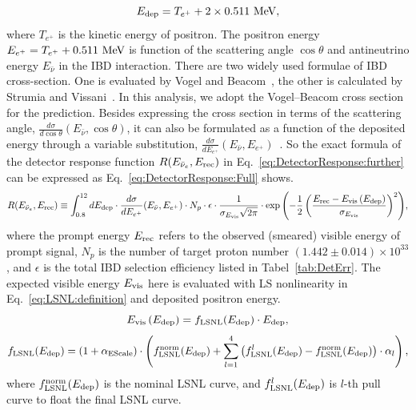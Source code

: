 \begin{equation}
    E_{\rm dep}=T_{e^+}+2\times0.511\ {\rm{MeV}},
    \label{eq:E_dep}
\end{equation}
where $T_{e^+}$ is the kinetic energy of positron. The positron energy $E_{e^+}=T_{e^+}+0.511~\rm{MeV}$ is function of the scattering angle $\cos\theta$ and antineutrino energy $E_{\bar{\nu}}$ in the IBD interaction. There are two widely used formulae of IBD cross-section. One is evaluated by Vogel and Beacom~\cite{Vogel:1999zy}, the other is calculated by Strumia and Vissani~\cite{Strumia:2003zx}. In this analysis, we adopt the Vogel–Beacom cross section for the prediction. Besides expressing the cross section in terms of the scattering angle, $\frac{d\sigma}{d\cos\theta}(E_{\bar{\nu}},\cos\theta)$, it can also be formulated as a function of the deposited energy through a variable substitution, $\frac{d\sigma}{dE_{e^+}}(E_{\bar{\nu}},E_{e^+})$~\cite{Vogel:1999zy}.
So the exact formula of the detector response function $R(E_{\bar{\nu}_e}, E_{\rm{rec}})$ in Eq.~\eqref{eq:DetectorResponse:further} can be expressed as Eq.~\eqref{eq:DetectorResponse:Full} shows.
\begin{equation}
    R(E_{\bar{\nu}_e}, E_{\rm{rec}}) \equiv \int_{0.8}^{12} dE_{\rm dep} \cdot \frac{d\sigma}{dE_{e^+}}(E_{\bar{\nu}},E_{e^+})
    \cdot N_p \cdot \epsilon \cdot
    \frac{1}{\sigma_{E_{\rm vis}}\sqrt{2\pi}}\cdot
    \exp{\left(-\frac{1}{2}\left(\frac{E_{\rm{rec}}-E_{\rm vis}\left(E_{\rm dep}\right)}{\sigma_{E_{\rm vis}}}\right)^2\right)},
    \label{eq:DetectorResponse:Full}
\end{equation}
where the prompt energy $E_{\rm{rec}}$ refers to the observed (smeared) visible energy of prompt signal, $N_p$ is the number of target proton number $(1.442\pm0.014)\times10^{33}$, and $\epsilon$ is the total IBD selection efficiency listed in Tabel~\ref{tab:DetErr}. The expected visible energy $E_{\rm vis}$ here is evaluated with LS nonlinearity in Eq.~\eqref{eq:LSNL:definition} and deposited positron energy.
\begin{equation}
    E_{\rm vis}\left(E_{\rm dep}\right)=f_{\rm LSNL}(E_{\rm dep})\cdot E_{\rm dep},
    \label{eq:LSNL:definition}
\end{equation}
\begin{equation}
    f_{\rm LSNL}(E_{\rm dep}) = \left( 1+\alpha_{\rm EScale} \right) \cdot \left( f_{\rm LSNL}^{\rm norm}(E_{\rm dep})+\sum_{l=1}^{4}\left(f_{\rm LSNL}^{l}(E_{\rm dep})-f_{\rm LSNL}^{\rm norm}(E_{\rm dep})\right) \cdot \alpha_{l} \right),
    \label{eq:LSNL:correction}
\end{equation}
where $f_{\rm LSNL}^{\rm norm}(E_{\rm dep})$ is the nominal LSNL curve, and $f_{\rm LSNL}^{l}(E_{\rm dep})$ is $l$-th pull curve to float the final LSNL curve.

